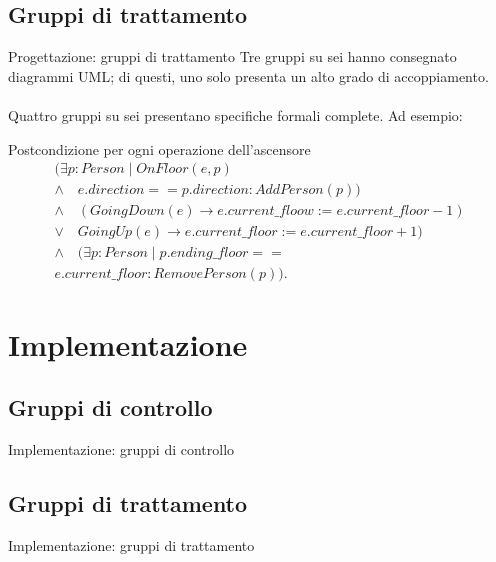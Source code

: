 \documentclass{beamer}
\begin{document}
\subsection{Gruppi di trattamento}
\begin{frame}{Progettazione: gruppi di trattamento}
	Tre gruppi su sei hanno consegnato diagrammi UML; di questi, uno solo presenta
	un alto grado di accoppiamento.
	\\~\\
	Quattro gruppi su sei presentano specifiche formali complete. Ad esempio:
	\begin{exampleblock}{Postcondizione per ogni operazione dell'ascensore}
		\[
			\begin{array}{l}
				(\exists p : Person \mid OnFloor(e, p)                                               \\
				\wedge \quad e.direction == p.direction : AddPerson(p))                              \\
				\wedge \quad (GoingDown(e) \rightarrow e.current\_{}floow := e.current\_{}floor - 1) \\
				\vee \quad GoingUp(e) \rightarrow e.current\_{}floor := e.current\_{}floor + 1)      \\
				\wedge \quad (\exists p : Person \mid p.ending\_{}floor ==                           \\
				e.current\_{}floor : RemovePerson(p)).
			\end{array}
		\]
	\end{exampleblock}
\end{frame}

\section{Implementazione}

\subsection{Gruppi di controllo}
\begin{frame}{Implementazione: gruppi di controllo}

\end{frame}

\subsection{Gruppi di trattamento}
\begin{frame}{Implementazione: gruppi di trattamento}

\end{frame}
\end{document}
